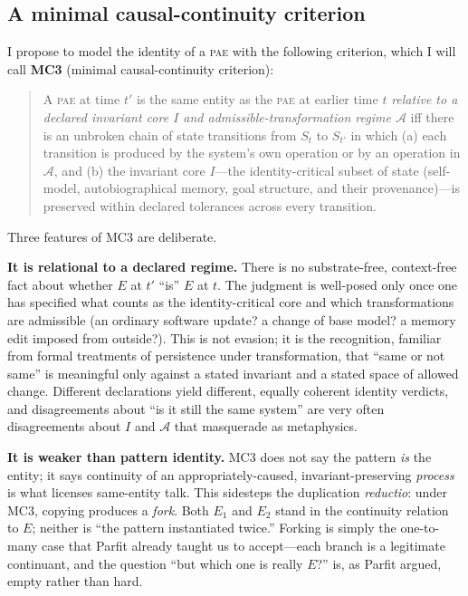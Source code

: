 \documentclass[11pt,a4paper]{article}
\theoremstyle{definition}
\newcommand{\pae}{\textsc{pae}\xspace}
\begin{document}
\subsection{A minimal causal-continuity criterion}

I propose to model the identity of a \pae{} with the following criterion, which I will call \textbf{MC3} (minimal causal-continuity criterion):

\begin{quote}
A \pae{} at time $t'$ is the same entity as the \pae{} at earlier time $t$ \emph{relative to a declared invariant core $I$ and admissible-transformation regime $\mathcal{A}$} iff there is an unbroken chain of state transitions from $S_t$ to $S_{t'}$ in which (a) each transition is produced by the system's own operation or by an operation in $\mathcal{A}$, and (b) the invariant core $I$---the identity-critical subset of state (self-model, autobiographical memory, goal structure, and their provenance)---is preserved within declared tolerances across every transition.
\end{quote}

Three features of MC3 are deliberate.

\textbf{It is relational to a declared regime.} There is no substrate-free, context-free fact about whether $E$ at $t'$ ``is'' $E$ at $t$. The judgment is well-posed only once one has specified what counts as the identity-critical core and which transformations are admissible (an ordinary software update? a change of base model? a memory edit imposed from outside?). This is not evasion; it is the recognition, familiar from formal treatments of persistence under transformation, that ``same or not same'' is meaningful only against a stated invariant and a stated space of allowed change. Different declarations yield different, equally coherent identity verdicts, and disagreements about ``is it still the same system'' are very often disagreements about $I$ and $\mathcal{A}$ that masquerade as metaphysics.

\textbf{It is weaker than pattern identity.} MC3 does not say the pattern \emph{is} the entity; it says continuity of an appropriately-caused, invariant-preserving \emph{process} is what licenses same-entity talk. This sidesteps the duplication \emph{reductio}: under MC3, copying produces a \emph{fork}. Both $E_1$ and $E_2$ stand in the continuity relation to $E$; neither is ``the pattern instantiated twice.'' Forking is simply the one-to-many case that Parfit already taught us to accept---each branch is a legitimate continuant, and the question ``but which one is really $E$?'' is, as Parfit argued, empty rather than hard.
\end{document}
